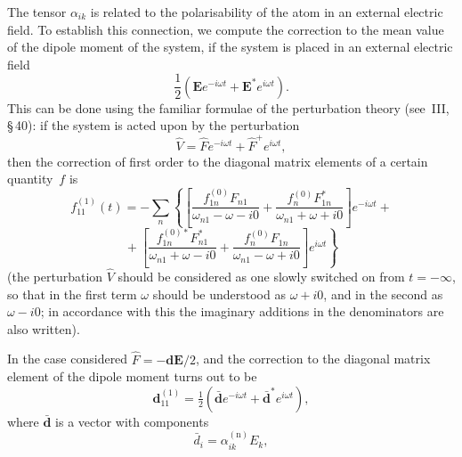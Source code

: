 The tensor $\alpha_{ik}$ is related to the polarisability of the atom in an external electric field. To establish this connection, we compute the correction to the mean value of the dipole moment of the system, if the system is placed in an external electric field
\[
\frac{1}{2}(\mathbf{E}e^{-i\omega t} + \mathbf{E}^*e^{i\omega t}).
\tag{59.20}
\]
This can be done using the familiar formulae of the perturbation theory (see~III, \S\,40): if the system is acted upon by the perturbation
\[
\hat{V} = \hat{F}e^{-i\omega t} + \hat{F}^+e^{i\omega t},
\]
then the correction of first order to the diagonal matrix elements of a certain quantity~$f$ is
\[
f^{(1)}_{11}(t) = -\sum_n\left\{\left[\frac{f^{(0)}_{1n}F_{n1}}{\omega_{n1} - \omega - i0} + \frac{f^{(0)}_n F^*_{1n}}{\omega_{n1} + \omega + i0}\right]e^{-i\omega t} +{}\right.
\]
\[
\left.{}+\left[\frac{f^{(0)*}_{1n}F^*_{n1}}{\omega_{n1} + \omega - i0} + \frac{f^{(0)}_n F_{1n}}{\omega_{n1} - \omega + i0}\right]e^{i\omega t}\right\}
\]
(the perturbation $\hat{V}$ should be considered as one slowly switched on from $t = -\infty$, so that in the first term $\omega$ should be understood as $\omega + i0$, and in the second as $\omega - i0$; in accordance with this the imaginary additions in the denominators are also written).

In the case considered $\hat{F} = -\mathbf{d}\mathbf{E}/2$, and the correction to the diagonal matrix element of the dipole moment turns out to be
\begin{equation}
\mathbf{d}^{(1)}_{11} = \tfrac{1}{2}(\bar{\mathbf{d}}e^{-i\omega t} + \bar{\mathbf{d}}^*e^{i\omega t}),
\tag{59.21}
\end{equation}
where $\bar{\mathbf{d}}$ is a vector with components
\begin{equation}
\bar{d}_i = \alpha^{(\mathrm{n})}_{ik}E_k,
\tag{59.22}
\end{equation}

